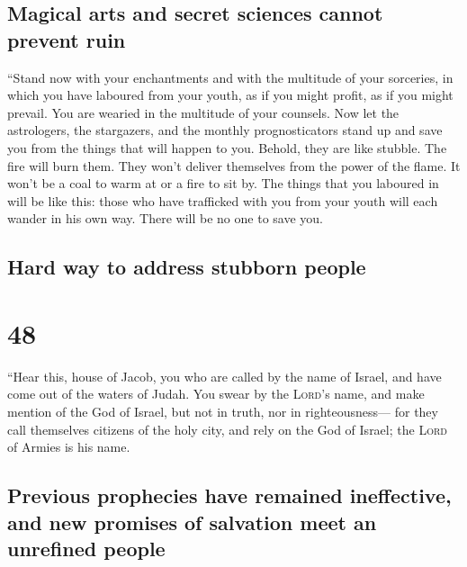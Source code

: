 \hypertarget{magical-arts-and-secret-sciences-cannot-prevent-ruin}{%
\subsection{Magical arts and secret sciences cannot prevent
ruin}\label{magical-arts-and-secret-sciences-cannot-prevent-ruin}}

 ``Stand now with your enchantments and with the
multitude of your sorceries, in which you have laboured from your youth,
as if you might profit, as if you might prevail.  You are
wearied in the multitude of your counsels. Now let the astrologers, the
stargazers, and the monthly prognosticators stand up and save you from
the things that will happen to you.  Behold, they are
like stubble. The fire will burn them. They won't deliver themselves
from the power of the flame. It won't be a coal to warm at or a fire to
sit by.  The things that you laboured in will be like
this: those who have trafficked with you from your youth will each
wander in his own way. There will be no one to save you.

\hypertarget{hard-way-to-address-stubborn-people}{%
\subsection{Hard way to address stubborn
people}\label{hard-way-to-address-stubborn-people}}

\hypertarget{section-47}{%
\section{48}\label{section-47}}

 ``Hear this, house of Jacob, you who are called by the
name of Israel, and have come out of the waters of Judah. You swear by
the \textsc{Lord}'s name, and make mention of the God of Israel, but not
in truth, nor in righteousness---  for they call
themselves citizens of the holy city, and rely on the God of Israel; the
\textsc{Lord} of Armies is his name.

\hypertarget{previous-prophecies-have-remained-ineffective-and-new-promises-of-salvation-meet-an-unrefined-people}{%
\subsection{Previous prophecies have remained ineffective, and new
promises of salvation meet an unrefined
people}\label{previous-prophecies-have-remained-ineffective-and-new-promises-of-salvation-meet-an-unrefined-people}}

